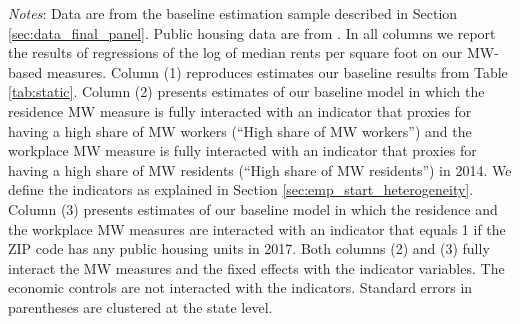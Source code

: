 \begin{table}[hbt!]
    \begin{minipage}{.95\textwidth} \footnotesize
        \vspace{2mm}
        \textit{Notes}: 
        Data are from the baseline estimation sample described in Section 
        \ref{sec:data_final_panel}.
        Public housing data are from \textcite{hudHousing}.
        In all columns we report the results of regressions of the log of median rents 
        per square foot on our MW-based measures.
        Column (1) reproduces estimates our baseline results from Table \ref{tab:static}.
        Column (2) presents estimates of our baseline model in which the residence MW 
        measure is fully interacted with an indicator that proxies for having a high share 
        of MW workers (``High share of MW workers'') and the workplace MW measure is 
        fully interacted with an indicator that proxies for having a high share of MW 
        residents (``High share of MW residents'') in 2014.
        We define the indicators as explained in Section \ref{sec:emp_start_heterogeneity}.
        Column (3) presents estimates of our baseline model in which the residence and 
        the workplace MW measures are interacted with an indicator that equals 1 if 
        the ZIP code has any public housing units in 2017.
        Both columns (2) and (3) fully interact the MW measures and the fixed effects
        with the indicator variables. The economic controls are not interacted with 
        the indicators.
        Standard errors in parentheses are clustered at the state level.
    \end{minipage}
\end{table}
